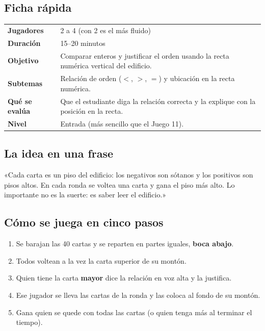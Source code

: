 \documentclass[12pt, letterpaper]{article}
\begin{document}
\subsection{Ficha rápida}

\begin{center}
\small
\begin{tabular}{@{}p{3cm} p{12.2cm}@{}}
\toprule
\textbf{Jugadores} & 2 a 4 (con 2 es el más fluido)\\
\textbf{Duración} & 15--20 minutos\\
\textbf{Objetivo} & Comparar enteros y justificar el orden usando la recta numérica vertical del edificio.\\
\textbf{Subtemas} & Relación de orden ($<$, $>$, $=$) y ubicación en la recta numérica.\\
\textbf{Qué se evalúa} & Que el estudiante diga la relación correcta y la explique con la posición en la recta.\\
\textbf{Nivel} & Entrada (más sencillo que el Juego 11).\\
\bottomrule
\end{tabular}
\end{center}

\subsection{La idea en una frase}

\begin{cuadroextra}
  «Cada carta es un piso del edificio: los negativos son sótanos y los positivos son pisos altos. En cada ronda se voltea una carta y gana el piso más alto. Lo importante no es la suerte: es saber leer el edificio.»
\end{cuadroextra}

\subsection{Cómo se juega en cinco pasos}

\begin{enumerate}[leftmargin=*]
  \item Se barajan las 40 cartas y se reparten en partes iguales, \textbf{boca abajo}.
  \item Todos voltean a la vez la carta superior de su montón.
  \item Quien tiene la carta \textbf{mayor} dice la relación en voz alta y la justifica.
  \item Ese jugador se lleva las cartas de la ronda y las coloca al fondo de su montón.
  \item Gana quien se quede con todas las cartas (o quien tenga más al terminar el tiempo).
\end{enumerate}
\end{document}
